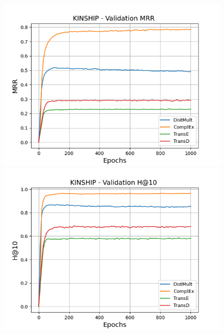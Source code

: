 \begin{figure}
    \centering
    \begin{minipage}{.3\textwidth}
      \centering
      \includegraphics[width=\linewidth]{figures/results/pretrain/kinship/pretrain_kinship_mrrs.png}
    \end{minipage}%
    \begin{minipage}{.3\textwidth}
      \centering
      \includegraphics[width=\linewidth]{figures/results/pretrain/kinship/pretrain_kinship_hit10.png}
    \end{minipage}
    \begin{minipage}{.3\textwidth}
      \centering

\end{minipage}
\end{figure}
